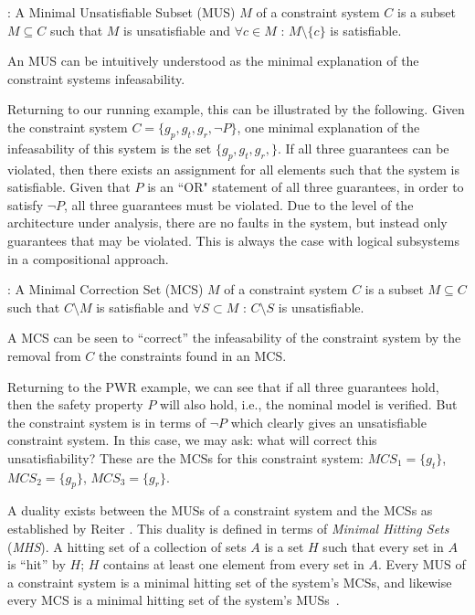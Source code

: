 \begin{definition} : A Minimal Unsatisfiable Subset (MUS) $M$ of a constraint system $C$ is a subset $M \subseteq C$ such that $M$ is unsatisfiable and $\forall c \in M$ : $M \setminus \{c\}$ is satisfiable. 
\end{definition}
\noindent
An MUS can be intuitively understood as the minimal explanation of the constraint systems infeasability. 

Returning to our running example, this can be illustrated by the following. Given the constraint system $C = \{g_p, g_t, g_r, \neg P\}$, one minimal explanation of the infeasability of this system is the set $\{g_p, g_t, g_r,\}$. If all three guarantees can be violated, then there exists an assignment for all elements such that the system is satisfiable. Given that $P$ is an ``OR" statement of all three guarantees, in order to satisfy $\neg P$, all three guarantees must be violated. Due to the level of the architecture under analysis, there are no faults in the system, but instead only guarantees that may be violated. This is always the case with logical subsystems in a compositional approach. 

\begin{definition} : A Minimal Correction Set (MCS) $M$ of a constraint system $C$ is a subset $M\subseteq C$ such that $C \setminus M$ is satisfiable and $\forall S \subset M$ : $C \setminus S$ is unsatisfiable. 
\end{definition}
\noindent
A MCS can be seen to ``correct'' the infeasability of the constraint system by the removal from $C$ the constraints found in an MCS.

Returning to the PWR example, we can see that if all three guarantees hold, then the safety property $P$ will also hold, i.e., the nominal model is verified. But the constraint system is in terms of $\neg P$ which clearly gives an unsatisfiable constraint system. In this case, we may ask: what will correct this unsatisfiability? These are the MCSs for this constraint system: $MCS_1 = \{g_t\}$, $MCS_2 = \{g_p\}$, $MCS_3 = \{g_r\}$. 

A duality exists between the MUSs of a constraint system and the MCSs as established by Reiter \cite{reiter1987theory}. This duality is defined in terms of \textit{Minimal Hitting Sets} (\textit{MHS}). A hitting set of a collection of sets $A$ is a set $H$ such that every set in $A$ is ``hit'' by $H$; $H$ contains at least one element from every set in $A$. Every MUS of a constraint system is a minimal hitting set of the system's MCSs, and likewise every MCS is a minimal hitting set of the system's MUSs~\cite{liffiton2016fast, reiter1987theory, de1987diagnosing}.

